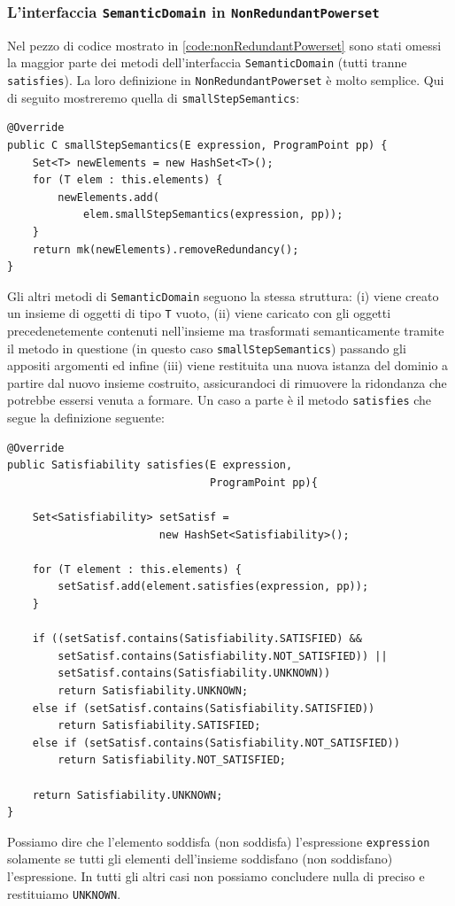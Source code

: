 \subsubsection{L'interfaccia \texttt{SemanticDomain} in \texttt{NonRedundantPowerset}}
Nel pezzo di codice mostrato in \ref{code:nonRedundantPowerset} sono stati omessi la maggior parte dei metodi dell'interfaccia \texttt{SemanticDomain} (tutti tranne \texttt{satisfies}). La loro definizione in \texttt{NonRedundantPowerset} è molto semplice. Qui di seguito mostreremo quella di \texttt{smallStepSemantics}:
\label{code:smallStepSemanticsPowersetGeneral}
\begin{lstlisting}[belowskip=-1.1 \baselineskip]
@Override
public C smallStepSemantics(E expression, ProgramPoint pp) {
    Set<T> newElements = new HashSet<T>();
    for (T elem : this.elements) {
        newElements.add(
            elem.smallStepSemantics(expression, pp));
    }
    return mk(newElements).removeRedundancy();
}
\end{lstlisting}
Gli altri metodi di \texttt{SemanticDomain} seguono la stessa struttura: (i) viene creato un insieme di oggetti di tipo \texttt{T} vuoto, (ii) viene caricato con gli oggetti precedenetemente contenuti nell'insieme ma trasformati semanticamente tramite il metodo in questione (in questo caso \texttt{smallStepSemantics}) passando gli appositi argomenti ed infine (iii) viene restituita una nuova istanza del dominio a partire dal nuovo insieme costruito, assicurandoci di rimuovere la ridondanza che potrebbe essersi venuta a formare. 
Un caso a parte è il metodo \texttt{satisfies} che segue la definizione seguente:
\label{code:satisfiesPowersetGeneral}
\begin{lstlisting}[belowskip=-1.1 \baselineskip]
@Override
public Satisfiability satisfies(E expression, 
                                ProgramPoint pp){
    
    Set<Satisfiability> setSatisf = 
                        new HashSet<Satisfiability>();

    for (T element : this.elements) {
        setSatisf.add(element.satisfies(expression, pp));
    }

    if ((setSatisf.contains(Satisfiability.SATISFIED) &&    
        setSatisf.contains(Satisfiability.NOT_SATISFIED)) ||
        setSatisf.contains(Satisfiability.UNKNOWN))
        return Satisfiability.UNKNOWN;
    else if (setSatisf.contains(Satisfiability.SATISFIED))
        return Satisfiability.SATISFIED;
    else if (setSatisf.contains(Satisfiability.NOT_SATISFIED))
        return Satisfiability.NOT_SATISFIED;

    return Satisfiability.UNKNOWN;
}
\end{lstlisting}
Possiamo dire che l'elemento soddisfa (non soddisfa) l'espressione \texttt{expression} solamente se tutti gli elementi dell'insieme soddisfano (non soddisfano) l'espressione. In tutti gli altri casi non possiamo concludere nulla di preciso e restituiamo \texttt{UNKNOWN}.

